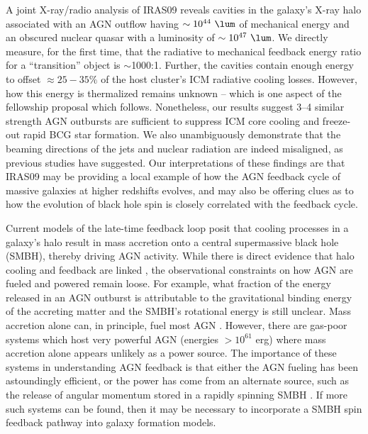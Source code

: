 \documentclass[letterpaper,12pt]{article}
\begin{document}
A joint X-ray/radio analysis of IRAS09 reveals cavities in the
galaxy's X-ray halo associated with an AGN outflow having $\sim
10^{44} ~\lum$ of mechanical energy and an obscured nuclear quasar
with a luminosity of $\sim 10^{47} ~\lum$. We directly measure, for
the first time, that the radiative to mechanical feedback energy ratio
for a ``transition'' object is $\sim$1000:1. Further, the cavities
contain enough energy to offset $\approx 25-35\%$ of the host
cluster's ICM radiative cooling losses. However, how this energy is
thermalized remains unknown -- which is one aspect of the fellowship
proposal which follows. Nonetheless, our results suggest 3--4 similar
strength AGN outbursts are sufficient to suppress ICM core cooling and
freeze-out rapid BCG star formation. We also unambiguously demonstrate
that the beaming directions of the jets and nuclear radiation are
indeed misaligned, as previous studies have suggested. Our
interpretations of these findings are that IRAS09 may be providing a
local example of how the AGN feedback cycle of massive galaxies at
higher redshifts evolves, and may also be offering clues as to how the
evolution of black hole spin is closely correlated with the feedback
cycle.

 Current models of the late-time
feedback loop posit that cooling processes in a galaxy's halo result
in mass accretion onto a central supermassive black hole (SMBH),
thereby driving AGN activity. While there is direct evidence that halo
cooling and feedback are linked \citep[\eg][]{haradent}, the
observational constraints on how AGN are fueled and powered remain
loose. For example, what fraction of the energy released in an AGN
outburst is attributable to the gravitational binding energy of the
accreting matter \citep{1984RvMP...56..255B} and the SMBH's rotational
energy \citep{2002NewAR..46..247M} is still unclear. Mass accretion
alone can, in principle, fuel most AGN
\citep[\eg][]{rafferty06}. However, there are gas-poor systems which
host very powerful AGN (energies $> 10^{61}$ erg) where mass accretion
alone appears unlikely as a power source. The importance of these
systems in understanding AGN feedback is that either the AGN fueling
has been astoundingly efficient, or the power has come from an
alternate source, such as the release of angular momentum stored in a
rapidly spinning SMBH \citep[\eg][]{msspin}. If more such systems can
be found, then it may be necessary to incorporate a SMBH spin feedback
pathway into galaxy formation models.
\end{document}
